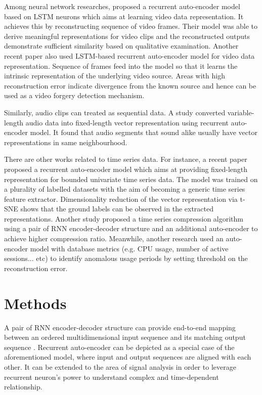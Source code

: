 \documentclass[runningheads]{llncs}
\begin{document}
Among neural network researches, \cite{srivastava-et-al} proposed a recurrent auto-encoder model based on LSTM neurons which aims at learning video data representation. It achieves this by reconstructing sequence of video frames. Their model was able to derive meaningful representations for video clips and the reconstructed outputs demonstrate sufficient similarity based on qualitative examination. Another recent paper \cite{davino} also used LSTM-based recurrent auto-encoder model for video data representation. Sequence of frames feed into the model so that it learns the intrinsic representation of the underlying video source. Areas with high reconstruction error indicate divergence from the known source and hence can be used as a video forgery detection mechanism.

Similarly, audio clips can treated as sequential data. A study \cite{chung} converted variable-length audio data into fixed-length vector representation using recurrent auto-encoder model. It found that audio segments that sound alike usually have vector representations in same neighbourhood.

There are other works related to time series data. For instance, a recent paper \cite{malhotra} proposed a recurrent auto-encoder model which aims at providing fixed-length representation for bounded univariate time series data. The model was trained on a plurality of labelled datasets with the aim of becoming a generic time series feature extractor. Dimensionality reduction of the vector representation via t-SNE shows that the ground  labels can be observed in the extracted representations. Another study \cite{hsu} proposed a time series compression algorithm using a pair of RNN encoder-decoder structure and an additional auto-encoder to achieve higher compression ratio. Meanwhile, another research \cite{lee-d} used an auto-encoder model with database metrics (e.g. CPU usage, number of active sessions... etc) to identify anomalous usage periods by setting threshold on the reconstruction error.

\section{Methods}

A pair of RNN encoder-decoder structure can provide end-to-end mapping between an ordered multidimensional input sequence and its matching output sequence \cite{sutskever2014,cho2014}. Recurrent auto-encoder can be depicted as a special case of the aforementioned model, where input and output sequences are aligned with each other. It can be extended to the area of signal analysis in order to leverage recurrent neuron’s power to understand complex and time-dependent relationship.
\end{document}
